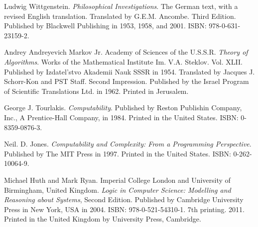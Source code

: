\begin{thebibliography}{9}
\backrefprint


Ludwig Wittgenstein. \emph{Philosophical Investigations}. The German text, with
a revised English translation.  Translated by G.E.M. Ancombe. Third Edition.
Published by Blackwell Publishing in 1953, 1958, and 2001. ISBN:
978-0-631-23159-2.

\backrefprint


Andrey Andreyevich Markov Jr. Academy of Sciences of the U.S.S.R. \emph{Theory
of Algorithms}. Works of the Mathematical Institute Im. V.A. Steklov. Vol.
XLII. Published by Izdatel'stvo Akademii Nauk SSSR in 1954. Translated by
Jacques J. Schorr-Kon and PST Staff. Second Impression. Published by the Israel
Program of Scientific Translations Ltd. in 1962. Printed in Jerusalem.

\backrefprint


George J. Tourlakis. \emph{Computability}. Published by Reston Publishin
Company, Inc., A Prentice-Hall Company, in 1984. Printed in the United States.
ISBN: 0-8359-0876-3.

\backrefprint


Neil. D. Jones. \emph{Computability and Complexity: From a Programming
Perspective}. Published by The MIT Press in 1997.  Printed in the United
States. ISBN: 0-262-10064-9.

\backrefprint





Michael Huth and Mark Ryan. Imperial College London and University of
Birmingham, United Kingdom. \emph{Logic in Computer Science: Modelling and
Reasoning about Systems}, Second Edition. Published by Cambridge University
Press in New York, USA in 2004. ISBN: 978-0-521-54310-1. 7th printing.  2011.
Printed in the United Kingdom by University Press, Cambridge.


\end{thebibliography}
